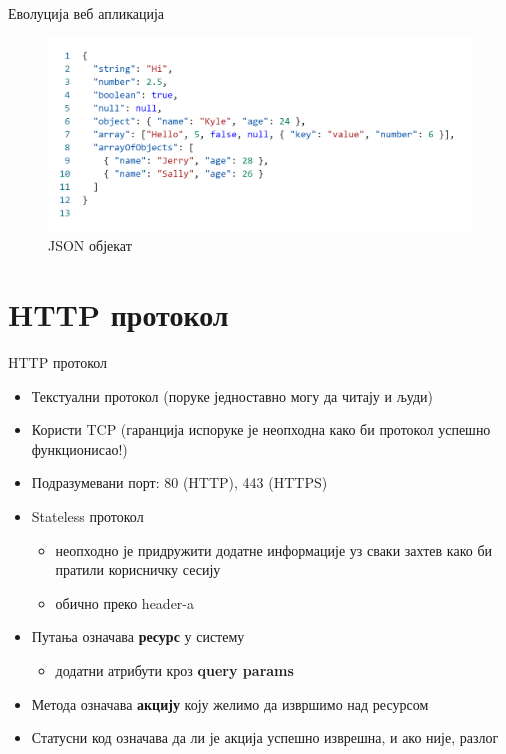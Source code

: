 \documentclass{beamer}
\begin{document}
\begin{frame}[allowframebreaks]{Еволуција веб апликација}
        \framebreak
        
        \begin{figure}
            \centering
            \includegraphics[height=\dimexpr \textheight - 4\baselineskip\relax]{images/json.png}
            \caption{JSON објекат}
            \label{fig:json}
        \end{figure}
    \end{frame}
    
    \section{HTTP протокол}
    
    \begin{frame}{HTTP протокол}
        \begin{itemize}
            \item Текстуални протокол (поруке једноставно могу да читају и људи)
            \item Користи TCP (гаранција испоруке је неопходна како би протокол успешно функционисао!)
            \item Подразумевани порт: 80 (HTTP), 443 (HTTPS)
            \item Stateless протокол
            \begin{itemize}
                \item неопходно је придружити додатне информације уз сваки захтев како би пратили корисничку сесију
                \item обично преко header-a
            \end{itemize}
            \item Путања означава \textbf{ресурс} у систему
            \begin{itemize}
                \item додатни атрибути кроз \textbf{query params}
            \end{itemize}
            \item Метода означава \textbf{акцију} коју желимо да извршимо над ресурсом
            \item Статусни код означава да ли је акција успешно изврешна, и ако није, разлог
        \end{itemize}
    \end{frame}
    
\end{document}

